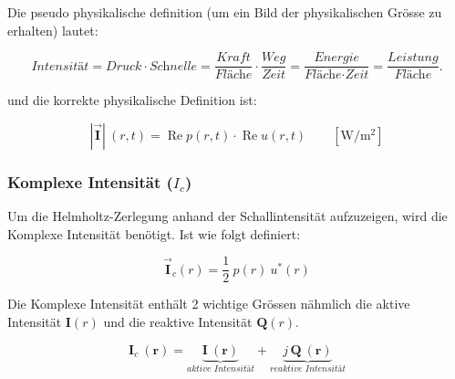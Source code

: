 Die pseudo physikalische definition (um ein Bild der physikalischen Grösse zu erhalten) lautet:

\begin{equation}
\textit{Intensität} = \textit{Druck} \cdot \textit{Schnelle}=\frac{\textit{Kraft}}{\textit{Fläche}} \cdot \frac{\textit{Weg}}{\textit{Zeit}} = \frac{\textit{Energie}}{\textit{Fläche}\cdot \textit{Zeit}} = \frac{\textit{Leistung}}{\textit{Fläche}}.
\label{helmholtz:equationIntensitaetPseudoDef}
\end{equation}

und die korrekte physikalische Definition ist:

\begin{equation}
\mathbf{|\vec{I}|} \:(r ,t)  =  \operatorname{Re}{p(r, t)} \cdot \operatorname{Re}{u(r, t)} \qquad [\si{\W / \square\metre}]
\label{helmholtz:equationIntensitaetMomentan}
\end{equation}


\subsubsection{Komplexe Intensität ($I_c$)}

Um die Helmholtz-Zerlegung anhand der Schallintensität aufzuzeigen, wird die Komplexe Intensität benötigt. Ist wie folgt definiert:

\begin{equation}
\mathbf{\vec{I}}_c (r)  = \frac{1}{2} \:  p(r) \: u^{*}(r) 
\label{helmholtz:equationIntensitaetKomplex}
\end{equation}

Die Komplexe Intensität enthält 2 wichtige Grössen nähmlich die aktive Intensität $\mathbf{I}(r)$ und die reaktive Intensität $\mathbf{Q}(r)$. 

\begin{equation}
	\mathbf{I}_c ~(\mathbf{r}) = \underbrace{\mathbf{I}~(\mathbf{r})}_{\textit{aktive Intensität}} + \underbrace{j\,\mathbf{Q}~(\mathbf{r})}_{\textit{reaktive~Intensität}}
\label{helmholtz:equationIntensitaetKomplex_2}
\end{equation}	

